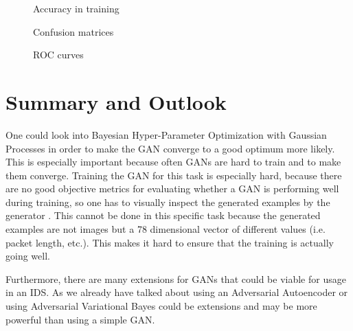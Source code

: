 \documentclass[]{article}
\begin{document}
	\begin{figure}[!tbp]
		\centering
		\hfill
		\hfill
		\caption{Accuracy in training}
	\end{figure}
	
	\begin{figure}[!tbp]
		\centering
		\hfill
		\hfill
		\caption{Confusion matrices}
	\end{figure}

	\begin{figure}[!tbp]
		\centering
		\hfill
		\hfill
		\caption{ROC curves}
	\end{figure}
	\section{Summary and Outlook}
	
	One could look into Bayesian Hyper-Parameter Optimization with Gaussian Processes in order to make the GAN converge to a good optimum more likely. This is especially important because often GANs are hard to train and to make them converge. Training the GAN for this task is especially hard, because there are no good objective metrics for evaluating whether a GAN is performing well during training, so one has to visually inspect the generated examples by the generator \cite{https://doi.org/10.48550/arxiv.1606.03498}. This cannot be done in this specific task because the generated examples are not images but a 78 dimensional vector of different values (i.e. packet length, etc.). This makes it hard to ensure that the training is actually going well. 
	
	Furthermore, there are many extensions for GANs that could be viable for usage in an IDS. As we already have talked about using an Adversarial Autoencoder or using Adversarial Variational Bayes could be extensions and may be more powerful than using a simple GAN. 
	\newpage
	
	
\end{document}
